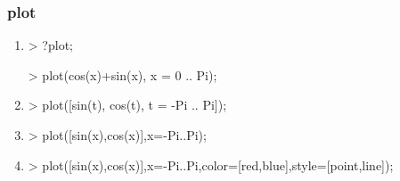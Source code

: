 \subsubsection{plot}
\begin{enumerate}
\item
\begin{MapleInput}
> ?plot;
\end{MapleInput}

\begin{MapleInput}
> plot(cos(x)+sin(x), x = 0 .. Pi);
\end{MapleInput}
\item
\begin{MapleInput}
> plot([sin(t), cos(t), t = -Pi .. Pi]);
\end{MapleInput}
\item
\begin{MapleInput}
> plot([sin(x),cos(x)],x=-Pi..Pi);
\end{MapleInput}
\item
\begin{MapleInput}
> plot([sin(x),cos(x)],x=-Pi..Pi,color=[red,blue],style=[point,line]);
\end{MapleInput}
\end{enumerate}